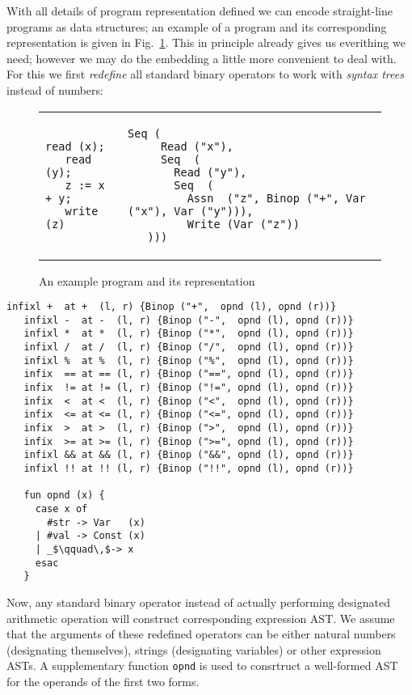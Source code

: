 With all details of program representation defined we can encode straight-line programs as \lama data structures;
an example of a program and its corresponding representation is given in Fig.~\ref{repr-example}.
This in principle already gives us everithing we need; however we may do the embedding a little more
convenient to deal with. For this we first \emph{redefine} all standard \lama binary operators to
work with \emph{syntax trees} instead of numbers:

\begin{figure}[t]
\begin{tabular}{p{2.5cm}|p{8cm}}
\begin{lstlisting}[basicstyle=\small]
   read (x);
   read (y);
   z := x + y;
   write (z)
\end{lstlisting} &
\begin{lstlisting}[mathescape=true,basicstyle=\small]
   Seq (
     Read ("x"),
     Seq  (
       Read ("y"),
       Seq  (
         Assn  ("z", Binop ("+", Var ("x"), Var ("y"))),
         Write (Var ("z"))
   )))
\end{lstlisting}
\end{tabular}
\caption{An example program and its representation}
\label{repr-example}
\end{figure}

\begin{lstlisting}[mathescape=true]
   infixl +  at +  (l, r) {Binop ("+",  opnd (l), opnd (r))}
   infixl -  at -  (l, r) {Binop ("-",  opnd (l), opnd (r))}
   infixl *  at *  (l, r) {Binop ("*",  opnd (l), opnd (r))}
   infixl /  at /  (l, r) {Binop ("/",  opnd (l), opnd (r))}
   infixl %  at %  (l, r) {Binop ("%",  opnd (l), opnd (r))}
   infix  == at == (l, r) {Binop ("==", opnd (l), opnd (r))}
   infix  != at != (l, r) {Binop ("!=", opnd (l), opnd (r))}
   infix  <  at <  (l, r) {Binop ("<",  opnd (l), opnd (r))}
   infix  <= at <= (l, r) {Binop ("<=", opnd (l), opnd (r))}
   infix  >  at >  (l, r) {Binop (">",  opnd (l), opnd (r))}
   infix  >= at >= (l, r) {Binop (">=", opnd (l), opnd (r))}
   infixl && at && (l, r) {Binop ("&&", opnd (l), opnd (r))}
   infixl !! at !! (l, r) {Binop ("!!", opnd (l), opnd (r))}

   fun opnd (x) {
     case x of
       #str -> Var   (x)
     | #val -> Const (x)
     | _$\qquad\,$-> x
     esac
   }
\end{lstlisting}

Now, any standard binary operator instead of actually performing designated arithmetic operation will
construct corresponding expression AST. We assume that the arguments of these redefined operators
can be either natural numbers (designating themselves), strings (designating variables) or other
expression ASTs. A supplementary function \lstinline|opnd| is used to consrtruct a well-formed AST
for the operands of the first two forms.

